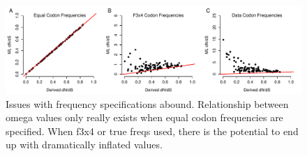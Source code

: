 \documentclass[11pt]{article}
\begin{document}
\bigskip
\begin{figure}[H]
\centerline{\includegraphics[width=6in]{figures/regression_fspec_kappatrue.pdf}}
\caption{\label{reg_fspec} Issues with frequency specifications abound. Relationship between omega values only really exists when equal codon frequencies are specified. When f3x4 or true freqs used, there is the potential to end up with dramatically inflated values.}
\end{figure}
	
\end{document}
